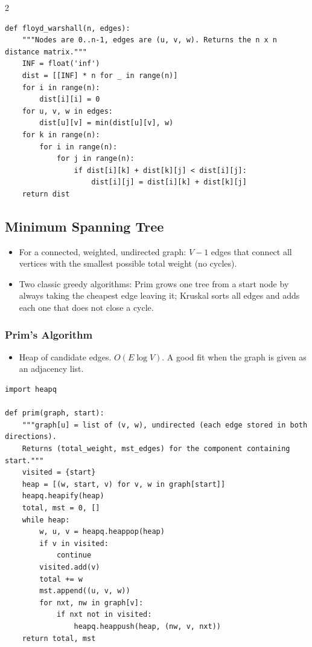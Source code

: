 \documentclass[9pt,a4paper]{extarticle}
\begin{document}
\begin{multicols}{2}
\begin{lstlisting}
def floyd_warshall(n, edges):
    """Nodes are 0..n-1, edges are (u, v, w). Returns the n x n distance matrix."""
    INF = float('inf')
    dist = [[INF] * n for _ in range(n)]
    for i in range(n):
        dist[i][i] = 0
    for u, v, w in edges:
        dist[u][v] = min(dist[u][v], w)
    for k in range(n):
        for i in range(n):
            for j in range(n):
                if dist[i][k] + dist[k][j] < dist[i][j]:
                    dist[i][j] = dist[i][k] + dist[k][j]
    return dist
\end{lstlisting}

\subsection{Minimum Spanning Tree}

\begin{itemize}
\item For a connected, weighted, undirected graph: $V-1$ edges that connect all vertices with the smallest possible total weight (no cycles).
\item Two classic greedy algorithms: Prim grows one tree from a start node by always taking the cheapest edge leaving it; Kruskal sorts all edges and adds each one that does not close a cycle.
\end{itemize}

\subsubsection{Prim's Algorithm}

\begin{itemize}
\item Heap of candidate edges. $O(E \log V)$. A good fit when the graph is given as an adjacency list.
\end{itemize}

\begin{lstlisting}
import heapq

def prim(graph, start):
    """graph[u] = list of (v, w), undirected (each edge stored in both directions).
    Returns (total_weight, mst_edges) for the component containing start."""
    visited = {start}
    heap = [(w, start, v) for v, w in graph[start]]
    heapq.heapify(heap)
    total, mst = 0, []
    while heap:
        w, u, v = heapq.heappop(heap)
        if v in visited:
            continue
        visited.add(v)
        total += w
        mst.append((u, v, w))
        for nxt, nw in graph[v]:
            if nxt not in visited:
                heapq.heappush(heap, (nw, v, nxt))
    return total, mst
\end{lstlisting}


\end{multicols}
\end{document}
